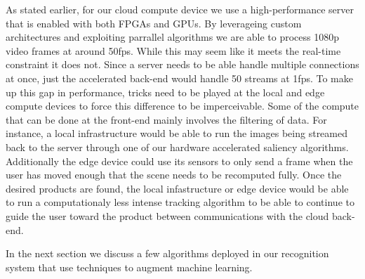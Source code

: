 As stated earlier, for our cloud compute device we use a high-performance server that is enabled with both FPGAs and GPUs. 
By leverageing custom architectures and exploiting parrallel algorithms we are able to process 1080p video frames at around 50fps. 
While this may seem like it meets the real-time constraint it does not. Since a server needs to be able handle multiple connections at once, 
just the accelerated back-end would handle 50 streams at 1fps. To make up this gap in performance, 
tricks need to be played at the local and edge compute devices to force this difference to be imperceivable. 
Some of the compute that can be done at the front-end mainly involves the filtering of data. For instance, a local infrastructure would be able to run the 
images being streamed back to the server through one of our hardware accelerated saliency algorithms. Additionally the edge device 
could use its sensors to only send a frame when the user has moved enough that the scene needs to be recomputed fully. Once the desired products are found, the local infastructure or edge device would be able to run a computationaly less intense tracking algorithm to be able to continue to guide the user toward the product between communications with the cloud back-end.

In the next section we discuss a few algorithms deployed in our recognition system that use techniques to augment machine learning. 

